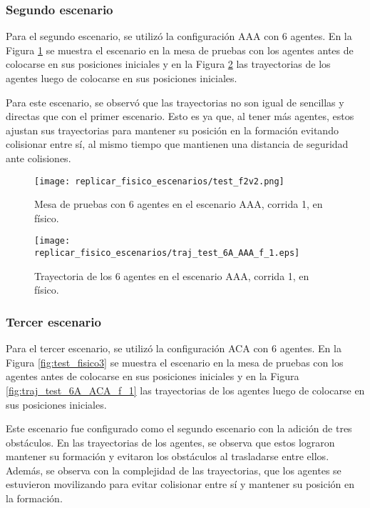 \subsubsection{Segundo escenario}
Para el segundo escenario, se utilizó la configuración AAA con 6 agentes. En la Figura \ref{fig:test_fisico2} se muestra el escenario en la mesa de pruebas con los agentes antes de colocarse en sus posiciones iniciales y en la Figura \ref{fig:traj_test_6A_AAA_f_1} las trayectorias de los agentes luego de colocarse en sus posiciones iniciales. 

Para este escenario, se observó que las trayectorias no son igual de sencillas y directas que con el primer escenario. Esto es ya que, al tener más agentes, estos ajustan sus trayectorias para mantener su posición en la formación evitando colisionar entre sí, al mismo tiempo que mantienen una distancia de seguridad ante colisiones.

\begin{figure}[H]
	\centering
	\texttt{[image: replicar\_fisico\_escenarios/test\_f2v2.png]}
	\caption{Mesa de pruebas con 6 agentes en el escenario AAA, corrida 1, en físico.}
	\label{fig:test_fisico2}
\end{figure}
\begin{figure}[H]
	\centering
	\texttt{[image: replicar\_fisico\_escenarios/traj\_test\_6A\_AAA\_f\_1.eps]}
	\caption{Trayectoria de los 6 agentes en el escenario AAA, corrida 1, en físico.}
	\label{fig:traj_test_6A_AAA_f_1}
\end{figure}

\subsubsection{Tercer escenario}
Para el tercer escenario, se utilizó la configuración ACA con 6 agentes. En la Figura \ref{fig:test_fisico3} se muestra el escenario en la mesa de pruebas con los agentes antes de colocarse en sus posiciones iniciales y en la Figura \ref{fig:traj_test_6A_ACA_f_1} las trayectorias de los agentes luego de colocarse en sus posiciones iniciales.

Este escenario fue configurado como el segundo escenario con la adición de tres obstáculos. En las trayectorias de los agentes, se observa que estos lograron mantener su formación y evitaron los obstáculos al trasladarse entre ellos. Además, se observa con la complejidad de las trayectorias, que los agentes se estuvieron movilizando para evitar colisionar entre sí y mantener su posición en la formación.

